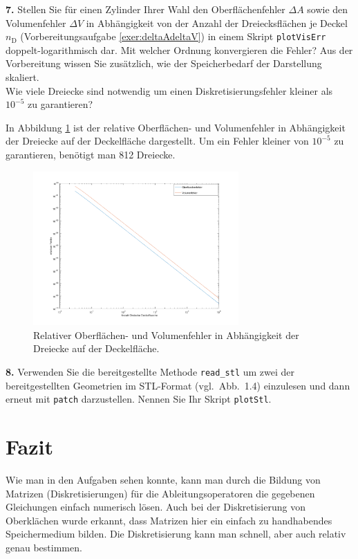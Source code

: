 \documentclass[Protokollheft.tex]{subfiles}
\begin{document}
	
	\begin{framed}
		\noindent \textbf{7.} Stellen Sie für einen Zylinder Ihrer Wahl den Oberflächenfehler $\Delta A$ sowie den Volumenfehler $\Delta V$ in Abhängigkeit von der Anzahl der Dreiecksflächen je Deckel $n_\text{D}$ (Vorbereitungsaufgabe \ref{exer:deltaAdeltaV}) in einem Skript
		\lstinline{plotVisErr} doppelt-logarithmisch dar.   Mit welcher Ordnung konvergieren die Fehler?
		Aus der Vorbereitung wissen Sie zusätzlich, wie der Speicherbedarf der
		Darstellung skaliert.\\
		Wie viele Dreiecke sind notwendig um einen Diskretisierungsfehler kleiner als $10^{-5}$ zu garantieren?\label{exer:plotVisErr}
	\end{framed}
	\noindent
	In Abbildung \ref{Abb:plotVisErr} ist der relative Oberflächen- und Volumenfehler in Abhängigkeit der Dreiecke auf der Deckelfläche dargestellt. Um ein Fehler kleiner von $10^{-5}$ zu garantieren, benötigt man 812 Dreiecke.
	\begin{figure}[h]
		\centering
		\includegraphics[trim = 25mm 10mm 25mm 15mm, clip, width=0.7\textwidth]{plotVisErrloglog.pdf}
		\caption{Relativer Oberflächen- und Volumenfehler in Abhängigkeit der Dreiecke auf der Deckelfläche.}
		\label{Abb:plotVisErr}
	\end{figure}
	
	\begin{framed}
		\noindent \textbf{8.} Verwenden Sie die bereitgestellte Methode \lstinline{read_stl} um zwei der bereitgestellten Geometrien im STL-Format (vgl.~Abb.~1.4) einzulesen und dann erneut mit \lstinline{patch} darzustellen.
		Nennen Sie Ihr Skript \lstinline{plotStl}.\label{exer:plotStl}
	\end{framed}
	
	
	
	\section{Fazit}
	Wie man in den Aufgaben sehen konnte, kann man durch die Bildung von Matrizen (Diskretisierungen) für die Ableitungsoperatoren die gegebenen Gleichungen einfach numerisch lösen. Auch bei der Diskretisierung von Oberklächen wurde erkannt, dass Matrizen hier ein einfach zu handhabendes Speichermedium bilden. Die Diskretisierung kann man schnell, aber auch relativ genau bestimmen.
	
\end{document}
